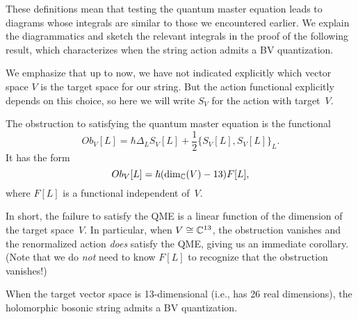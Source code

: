 These definitions mean that testing the quantum master equation leads to diagrams whose integrals are similar to those we encountered earlier.
We explain the diagrammatics and sketch the relevant integrals in the proof of the following result,
which characterizes when the string action admits a BV quantization.

We emphasize that up to now, we have not indicated explicitly which vector space $V$ is the target space for our string.
But the action functional explicitly depends on this choice,
so here we will write $S_V$ for the action with target~$V$.

\begin{prop}
The obstruction to satisfying the quantum master equation is the functional
\[
Ob_V[L] = \hbar \Delta_{L} S_V[L] + \frac{1}{2}\{S_V[L],S_V[L]\}_L.
\]
It has the form
\[
Ob_V[L] = \hbar (\dim_\mathbb C(V) - 13) F[L],
\]
where $F[L]$ is a functional independent of~$V$.
\end{prop}

In short, the failure to satisfy the QME is a linear function of the dimension of the target space~$V$.
In particular, when $V \cong \mathbb C^{13}$, 
the obstruction vanishes and the renormalized action {\em does} satisfy the QME, 
giving us an immediate corollary.
(Note that we do {\em not} need to know $F[L]$ to recognize that the obstruction vanishes!)

\begin{cor}
When the target vector space is 13-dimensional (i.e., has 26 real dimensions),
the holomorphic bosonic string admits a BV quantization.
\end{cor}

